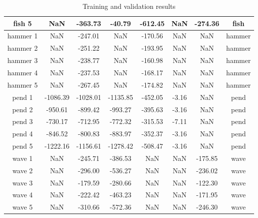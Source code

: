\documentclass[twoside]{article}
\begin{document}
\begin{table}[H]
\begin{tabular}{|c|c|c|c|c|c|c|c|}
fish 5 & NaN & -363.73 &  -40.79 & -612.45 & NaN & -274.36 & fish \\ \hline\hline
hammer 1 & NaN & -247.01 & NaN & -170.56 & NaN & NaN & hammer\\
hammer 2 & NaN & -251.22 & NaN & -193.95 & NaN & NaN & hammer\\
hammer 3 & NaN & -238.77 & NaN & -160.98 & NaN & NaN & hammer\\
hammer 4 & NaN & -237.53 & NaN & -168.17 & NaN & NaN & hammer\\
hammer 5 & NaN & -267.45 & NaN & -174.82 & NaN & NaN & hammer\\ \hline\hline
pend 1 & -1086.39 & -1028.01 & -1135.85 & -452.05 & -3.16 & NaN & pend\\
pend 2 &  -950.61 &  -899.42 &  -993.27 & -395.63 & -3.16 & NaN & pend\\
pend 3 &  -730.17 &  -712.95 &  -772.32 & -315.53 & -7.11 & NaN & pend\\
pend 4 &  -846.52 &  -800.83 &  -883.97 & -352.37 & -3.16 & NaN & pend\\
pend 5 & -1222.16 & -1156.61 & -1278.42 & -508.47 & -3.16 & NaN & pend\\\hline\hline
wave 1 & NaN & -245.71 & -386.53 & NaN & NaN & -175.85 & wave\\
wave 2 & NaN & -296.00 & -536.27 & NaN & NaN & -236.02 & wave\\
wave 3 & NaN & -179.59 & -280.66 & NaN & NaN & -122.30 & wave\\
wave 4 & NaN & -222.42 & -463.23 & NaN & NaN & -171.95 & wave\\
wave 5 & NaN & -310.66 & -572.36 & NaN & NaN & -246.30 & wave\\\hline
\end{tabular}
\caption{Training and validation results}
\label{table:result}
\end{table}
\end{document}
